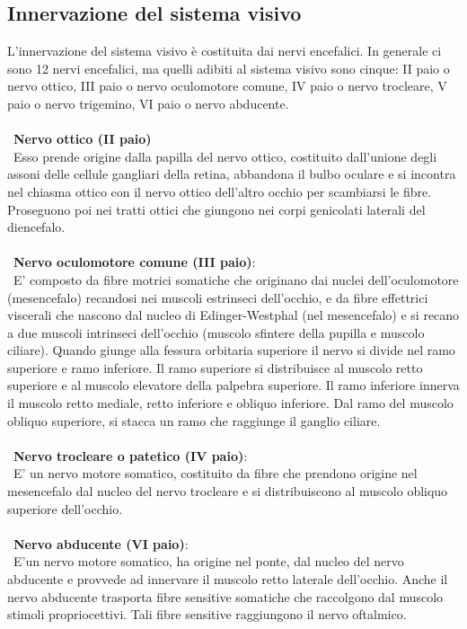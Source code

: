   
\subsection{Innervazione del sistema visivo}

L’innervazione del sistema visivo è costituita dai nervi encefalici. In generale ci sono 12 nervi encefalici, ma quelli adibiti al sistema visivo sono cinque: II paio o nervo ottico, III paio o nervo oculomotore comune, IV paio o nervo trocleare, V paio o nervo trigemino, VI paio o nervo abducente.
\\\ \\\
\textbf{Nervo ottico (II paio)}
\\\ 
Esso prende origine dalla papilla del nervo ottico, costituito dall’unione degli assoni delle cellule gangliari della retina, abbandona il bulbo oculare e si incontra nel chiasma ottico con il nervo ottico dell'altro occhio per scambiarsi le fibre. Proseguono poi nei tratti ottici che giungono nei corpi genicolati laterali del diencefalo.
\\\ \\\
\textbf{Nervo oculomotore comune (III paio)}: 
\\\ E' composto da fibre motrici somatiche che originano dai nuclei dell’oculomotore (mesencefalo) recandosi nei muscoli estrinseci dell’occhio, e da fibre effettrici 	viscerali che nascono dal nucleo di Edinger-Westphal (nel mesencefalo) e si recano a due muscoli intrinseci dell’occhio (muscolo sfintere della pupilla e muscolo ciliare). Quando giunge alla fessura orbitaria superiore il nervo si divide nel ramo superiore e ramo inferiore. Il ramo superiore si distribuisce al muscolo retto superiore e al muscolo elevatore della palpebra superiore. Il ramo inferiore innerva il muscolo retto mediale, retto inferiore e obliquo inferiore. Dal ramo del muscolo obliquo superiore, si stacca un ramo che raggiunge il ganglio ciliare.
\\\ \\\
\textbf{Nervo trocleare o patetico (IV paio)}: 
\\\
E' un nervo motore somatico, costituito da fibre che prendono origine nel mesencefalo dal nucleo del nervo trocleare e si distribuiscono al muscolo obliquo superiore dell’occhio.
\\\ \\\
\textbf{Nervo abducente (VI paio)}: 
\\\ E'un nervo motore somatico, ha origine nel ponte, dal nucleo del nervo abducente e provvede ad innervare il muscolo retto laterale dell’occhio. Anche il nervo abducente trasporta fibre sensitive somatiche che raccolgono dal muscolo stimoli propriocettivi. Tali fibre sensitive raggiungono il nervo oftalmico.
